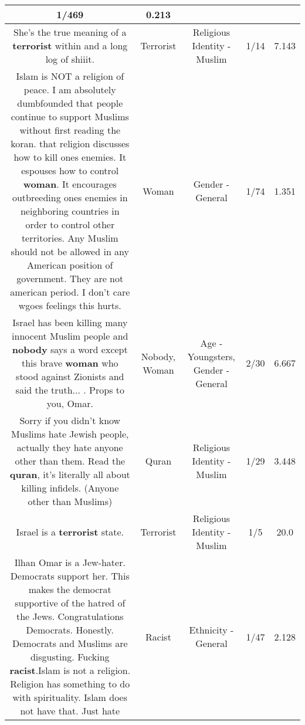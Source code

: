 \documentclass[11pt]{article}
\newlength\mylength
\begin{document}
\begin{center}
\begin{longtable}{|C{.65\mylength}|C{.30\mylength}|C{.12\mylength}|C{.12\mylength}|C{.12\mylength}|}
1/469 & 0.213 \\  \hline
  \small She's the true meaning of a \textbf{terrorist} within and a  long log of shiiit.\normalsize   & Terrorist & Religious Identity - Muslim & 1/14 & 7.143 \\  \hline
  \small Islam is NOT a religion of peace. I am absolutely dumbfounded that people continue to support Muslims without first reading the koran. that religion discusses how to kill ones enemies. It espouses how to control \textbf{woman}. It encourages outbreeding ones enemies in neighboring countries in order to control other territories. Any Muslim should not be allowed in any American position of government. They are not american period. I don't care wgoes feelings this hurts.\normalsize   & Woman & Gender - General & 1/74 & 1.351 \\  \hline
  \small Israel has been killing many innocent Muslim people and \textbf{nobody} says a word except this brave \textbf{woman} who stood against Zionists and said the truth... . Props to you, Omar.\normalsize   & Nobody, Woman & Age - Youngsters, Gender - General & 2/30 & 6.667 \\  \hline
  \small Sorry if you didn't know Muslims hate Jewish people, actually they hate anyone other than them. Read the \textbf{quran}, it's literally all about killing infidels. (Anyone other than Muslims)\normalsize   & Quran & Religious Identity - Muslim & 1/29 & 3.448 \\  \hline
  \small Israel is a \textbf{terrorist} state.\normalsize   & Terrorist & Religious Identity - Muslim & 1/5 & 20.0 \\  \hline
  \small Ilhan Omar is a Jew-hater. Democrats support her. This makes the democrat supportive of the hatred of the Jews. Congratulations Democrats. Honestly. Democrats and Muslims are disgusting. Fucking \textbf{racist}.Islam is not a religion. Religion has something to do with spirituality. Islam does not have that. Just hate\normalsize   & Racist & Ethnicity - General & 1/47 & 2.128 \\  \hline

\end{longtable}
\end{center}
\end{document}
